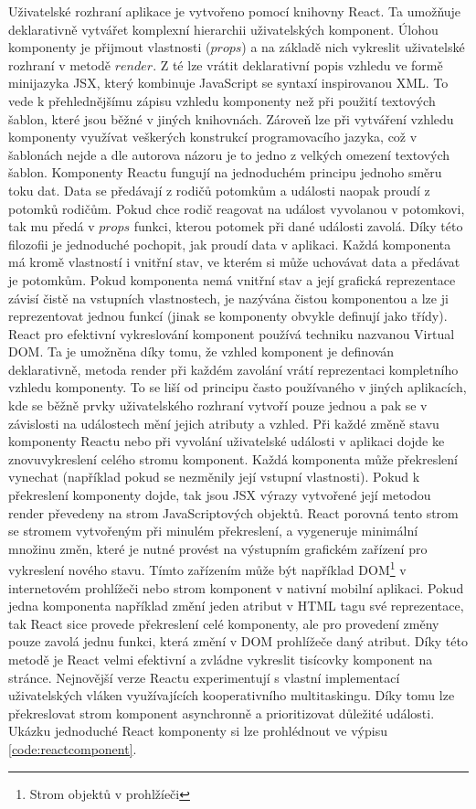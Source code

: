 Uživatelské rozhraní aplikace je vytvořeno pomocí knihovny React. Ta umožňuje deklarativně vytvářet komplexní hierarchii uživatelských komponent. Úlohou komponenty je přijmout vlastnosti ($props$) a na základě nich vykreslit uživatelské rozhraní v metodě $render$. Z té lze vrátit deklarativní popis vzhledu ve formě minijazyka JSX, který kombinuje JavaScript se syntaxí inspirovanou XML. To vede k přehlednějšímu zápisu vzhledu komponenty než při použití textových šablon, které jsou běžné v jiných knihovnách. Zároveň lze při vytváření vzhledu komponenty využívat veškerých konstrukcí programovacího jazyka, což v šablonách nejde a dle autorova názoru je to jedno z velkých omezení textových šablon. Komponenty Reactu fungují na jednoduchém principu jednoho směru toku dat. Data se předávají z rodičů potomkům a události naopak proudí z potomků rodičům. Pokud chce rodič reagovat na událost vyvolanou v potomkovi, tak mu předá v $props$ funkci, kterou potomek při dané události zavolá. Díky této filozofii je jednoduché pochopit, jak proudí data v aplikaci. Každá komponenta má kromě vlastností i vnitřní stav, ve kterém si může uchovávat data a předávat je potomkům. Pokud komponenta nemá vnitřní stav a její grafická reprezentace závisí čistě na vstupních vlastnostech, je nazývána čistou komponentou a lze ji reprezentovat jednou funkcí (jinak se komponenty obvykle definují jako třídy).
React pro efektivní vykreslování komponent používá techniku nazvanou Virtual DOM. Ta je umožněna díky tomu, že vzhled komponent je definován deklarativně, metoda render při každém zavolání vrátí reprezentaci kompletního vzhledu komponenty. To se liší od principu často používaného v jiných aplikacích, kde se běžně prvky uživatelského rozhraní vytvoří pouze jednou a pak se v závislosti na událostech mění jejich atributy a vzhled. Při každé změně stavu komponenty Reactu nebo při vyvolání uživatelské události v aplikaci dojde ke znovuvykreslení celého stromu komponent. Každá komponenta může překreslení vynechat (například pokud se nezměnily její vstupní vlastnosti). Pokud k překreslení komponenty dojde, tak jsou JSX výrazy vytvořené její metodou render převedeny na strom JavaScriptových objektů. React porovná tento strom se stromem vytvořeným při minulém překreslení, a vygeneruje minimální množinu změn, které je nutné provést na výstupním grafickém zařízení pro vykreslení nového stavu. Tímto zařízením může být například DOM\footnote{Strom objektů v prohlžíeči} v internetovém prohlížeči nebo strom komponent v nativní mobilní aplikaci. Pokud jedna komponenta například změní jeden atribut v HTML tagu své reprezentace, tak React sice provede překreslení celé komponenty, ale pro provedení změny pouze zavolá jednu funkci, která změní v DOM prohlížeče daný atribut.  Díky této metodě je React velmi efektivní a zvládne vykreslit tisícovky komponent na stránce. Nejnovější verze Reactu experimentují s vlastní implementací uživatelských vláken využívajících kooperativního multitaskingu. Díky tomu lze překreslovat strom komponent asynchronně a prioritizovat důležité události. Ukázku jednoduché React komponenty si lze prohlédnout ve výpisu \ref{code:reactcomponent}.

